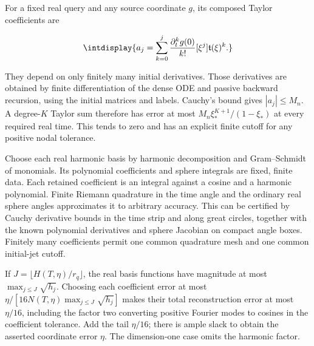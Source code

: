 
For a fixed real query and any source coordinate \(g\), its composed Taylor coefficients are


\begingroup\renewcommand{\theHequation}{intdisplay.564}
\begin{equation}
\intdisplay{
a_j=\sum_{k=0}^j\frac{\partial_t^kg(0)}{k!}
                         [\xi^j]\mathfrak t(\xi)^k.
}
\label{int:eq-0235-harmonic-finite-initial-jet-coefficients}
\end{equation}
\endgroup


They depend on only finitely many initial derivatives. Those derivatives are obtained by finite differentiation of the dense ODE and passive backward recursion, using the initial matrices and labels. Cauchy's bound gives \(|a_j|\le M_n\). A degree-\(K\) Taylor sum therefore has error at most \(M_n\xi_*^{K+1}/(1-\xi_*)\) at every required real time. This tends to zero and has an explicit finite cutoff for any positive nodal tolerance.



Choose each real harmonic basis by harmonic decomposition and Gram--Schmidt of monomials. Its polynomial coefficients and sphere integrals are fixed, finite data. Each retained coefficient is an integral against a cosine and a harmonic polynomial. Finite Riemann quadrature in the time angle and the ordinary real sphere angles approximates it to arbitrary accuracy. This can be certified by Cauchy derivative bounds in the time strip and along great circles, together with the known polynomial derivatives and sphere Jacobian on compact angle boxes. Finitely many coefficients permit one common quadrature mesh and one common initial-jet cutoff.



If \(J=\lfloor H(T,\allowbreak \eta)/r_q\rfloor\), the real basis functions have magnitude at most \(\max_{j\le J}\sqrt{h_j}\). Choosing each coefficient error at most \(\eta/[16N(T,\allowbreak \eta)\max_{j\le J}\sqrt{h_j}]\) makes their total reconstruction error at most \(\eta/16\), including the factor two converting positive Fourier modes to cosines in the coefficient tolerance. Add the tail \(\eta/16\); there is ample slack to obtain the asserted coordinate error \(\eta\). The dimension-one case omits the harmonic factor.




